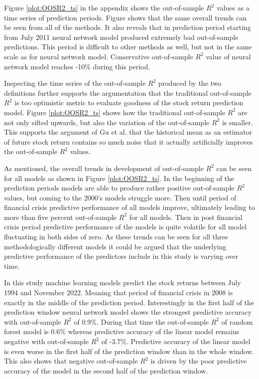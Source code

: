 \documentclass{article}
\begin{document}

Figure \ref{plot:OOSR2_ts} in the appendix shows the out-of-sample $R^2$ values as a time series of prediction periods. Figure shows that the same overall trends can be seen from all of the methods. It also reveals that in prediction period starting from July 2011 neural network model produced extremely bad out-of-sample predictions. This period is difficult to other methods as well, but not in the same scale as for neural network model. Conservative out-of-sample $R^2$ value of neural network model reaches -10\% during this period. \par

Inspecting the time series of the out-of-sample $R^2$ produced by the two definitions further supports the argumentation that the traditional out-of-sample $R^2$ is too optimistic metric to evaluate goodness of the stock return prediction model. Figure \ref{plot:OOSR2_ts} shows how the traditional out-of-sample $R^2$ are not only sifted upwards, but also the variation of the out-of-sample $R^2$ is smaller. This supports the argument of Gu et al. \citeyear{guetal} that the historical mean as an estimator of future stock return contains so much noise that it actually artificially improves the out-of-sample $R^2$ values. \par

As mentioned, the overall trends in development of out-of-sample $R^2$ can be seen for all models as shown in Figure \ref{plot:OOSR2_ts}. In the beginning of the prediction periods models are able to produce rather positive out-of-sample $R^2$ values, but coming to the 2000's models struggle more. Then until period of financial crisis predictive performance of all models improve, ultimately leading to more than five percent out-of-sample $R^2$ for all models. Then in post financial crisis period predictive performance of the models is quite volatile for all model fluctuating in both sides of zero. As these trends can be seen for all three methodologically different models it could be argued that the underlying predictive performance of the predictors include in this study is varying over time. \par

In this study machine learning models predict the stock returns between July 1994 and November 2022. Meaning that period of financial crisis in 2008 is exactly in the middle of the prediction period. Interestingly in the first half of the prediction window neural network model shows the strongest predictive accuracy with out-of-sample $R^2$ of 0.9\%. During that time the out-of-sample $R^2$ of random forest model is 0.6\% whereas predictive accuracy of the linear model remains negative with out-of-sample $R^2$ of -3.7\%. Predictive accuracy of the linear model is even worse in the first half of the prediction window than in the whole window. This also shows that negative out-of-sample $R^2$ is driven by the poor predictive accuracy of the model in the second half of the prediction window. \par
\end{document}
